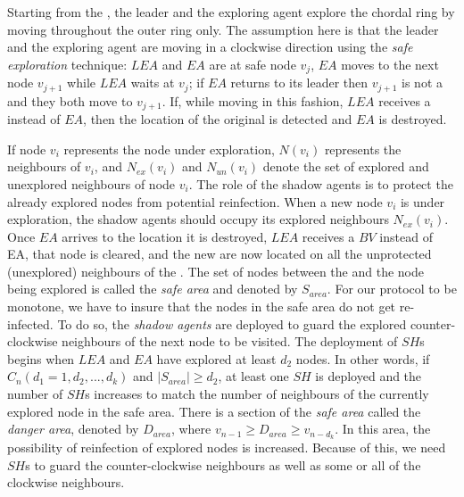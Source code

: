  Starting from the  \hb, the leader and the exploring agent explore    the
 chordal ring by moving throughout the outer  ring  only. The assumption here is that the leader and the exploring agent are moving in a clockwise direction using the {\em safe exploration} technique:  $LEA$ and $EA$ are at safe node $v_{j}$, $EA$ moves to the next node $v_{j+1}$ while $LEA$ waits at $v_{j}$; if $EA$ returns to its leader then $v_{j+1}$ is not a \bv and they both move to $v_{j+1}$. If, while moving in this fashion,  $LEA$ receives a \bv instead of $EA$, then the location of the original \bv is detected and $EA$ is destroyed. 


  If node $v_i$ represents the node under exploration, $N(v_i) $ represents the neighbours of $v_i$, and  $N_{ex}(v_i) $  and $N_{un}(v_i)$ denote the set of explored and unexplored neighbours of node $v_i$. 
  The role of the shadow agents is to protect the already explored nodes from potential reinfection. When a new node $v_i$ is under exploration, the shadow agents should occupy its explored neighbours $N_{ex}(v_i)$.
Once $EA$ arrives to the \bv location it is destroyed, $LEA$ receives a $BV$ instead of EA, that node is cleared, and the new \bvs are now located on  all the unprotected (unexplored) neighbours of the \bv.
The set of nodes between the \hb and the node being explored is called the {\em safe area} and denoted by $S_{area}$. For  our protocol to be monotone, we have to insure that the nodes in the safe area do  not get re-infected. To do so,  the {\em   shadow agents} are deployed to guard the explored counter-clockwise neighbours of the next node to be visited. The deployment of $SH$s begins when $LEA$ and $EA$ have explored at least $d_2$ nodes. In other words, if $C_n( d_1=1, d_{2}, ..., d_{k})$
and $\left\vert{S_{area}}\right\vert \ge d_2$, at least one $SH$ is deployed and the number of $SH$s increases to match the number of neighbours of the currently explored node in the safe area. 
There is a section of the {\em safe area}  called the {\it danger area}, denoted by $D_{area}$, where $v_{n-1}\ge D_{area}\ge v_{n-d_k}$. In this area, the possibility of reinfection of explored nodes is increased. Because of this, we need $SH$s to guard the counter-clockwise neighbours as well as some or all of the clockwise neighbours.

